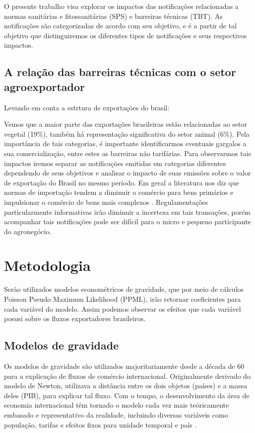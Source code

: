 \documentclass[12pt, a4paper]{article}
\begin{document}
O presente trabalho visa explorar os impactos das notificações relacionadas a normas sanitárias e fitossanitárias  (SPS) e barreiras técnicas  (TBT). As notificações são categorizadas de acordo com seu objetivo, e é a partir de tal objetivo que distinguiremos os diferentes tipos de notificações e seus respectivos impactos.

\subsection{A relação das barreiras técnicas com o setor agroexportador}

Levando em conta a estrtura de exportações do brasil:



Vemos que a maior parte das exportações brasileiras estão relacionadas ao setor vegetal (19\%), também há representação significativa do setor animal (6\%). Pela importância de tais categorias, é importante identificarmos eventuais gargalos a sua comercialização, entre estes as barreiras não tarifárias. Para observarmos  tais impactos iremos separar as notificações emitidas em categorias diferentes dependendo de seus objetivos e analisar o impacto de suas emissões sobre o valor de exportação do Brasil no mesmo período. Em geral a literatura  nos diz que normas de importação tendem a diminuir o comércio para bens primários e impulsionar o comércio de bens mais complexos \cite{moenius}. Regulamentações particularmente informativas irão diminuir a incerteza em tais transações, porém acompanhar tais notificações pode ser difícil para o micro e pequeno participante do agronegócio. 

\section{Metodologia}

Serão utilizados modelos econométricos de gravidade, que por meio de cálculos Poisson Pseudo Maximum Likelihood (PPML), irão retornar coeficientes para cada variável do modelo. Assim podemos observar os efeitos que cada variável posusi sobre os fluxos exportadores brasileiros.

\subsection{Modelos de gravidade}

Os modelos de gravidade são utilizados majoritariamente desde a década de 60 para a explicação de fluxos de comércio internacional. Originalmente derivado do modelo de Newton, utilizava a distância entre os dois objetos (países) e a massa deles (PIB), para explicar tal fluxo. Com o tempo, o desenvolvimento da área de economia internacional têm tornado o modelo cada vez mais teóricamente embasado e representativo da realidade, incluindo diversas variáveis como população, tarifas e efeitos fixos para unidade temporal e país \cite{nascimento2013evoluccao}.
\end{document}
